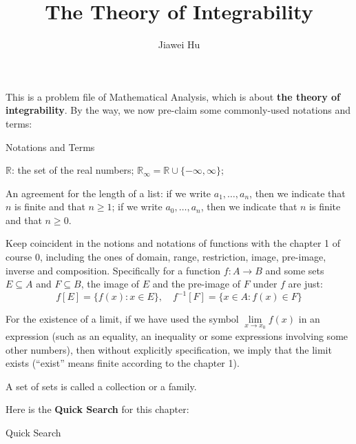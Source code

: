 \documentclass{article}
\title{\LARGE \textbf{The Theory of Integrability}}
\author{\large Jiawei Hu}
\begin{document}
\maketitle

This is a problem file of Mathematical Analysis, which is about \textbf{the theory of integrability}. By the way, we now pre-claim some commonly-used notations and terms:
\begin{Df}{Notations and Terms}
    \begin{compactenum}
        \item $\mathbb{R}$: the set of the real numbers; $\mathbb{R}_\infty = \mathbb{R}\cup\{-\infty, \infty\}$;
        \item An agreement for the length of a list: if we write $a_1, \dots, a_n$, then we indicate that $n$ is finite and that $n\geq 1$; if we write $a_0, \dots, a_n$, then we indicate that $n$ is finite and that $n\geq 0$.
        \item Keep coincident in the notions and notations of functions with the chapter 1 of course 0, including the ones of domain, range, restriction, image, pre-image, inverse and composition. Specifically for a function $f: A\rightarrow B$ and some sets $E\subseteq A$ and $F\subseteq B$, the image of $E$ and the pre-image of $F$ under $f$ are just:
        $$f[E] = \{f(x): x\in E\},\quad f^{-1}[F] = \{x\in A: f(x)\in F\}$$
        \item For the existence of a limit, if we have used the symbol $\lim\limits_{x\to x_0} f(x)$ in an expression (such as an equality, an inequality or some expressions involving some other numbers), then without explicitly specification, we imply that the limit exists (``exist'' means finite according to the chapter 1).
        \item A set of sets is called a collection or a family.
    \end{compactenum}
\end{Df}

Here is the \textbf{Quick Search} for this chapter:
\begin{Th}{Quick Search}
\end{Th}
\end{document}
